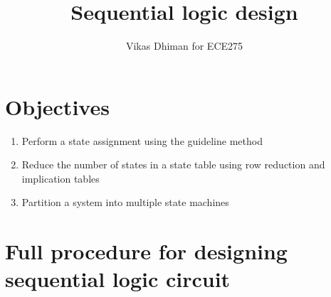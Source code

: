 \documentclass{article}
\author{Vikas Dhiman for ECE275}
\title{Sequential logic design}
\begin{document}
\maketitle


\section{Objectives}
\begin{enumerate}
\item Perform a state assignment using the guideline method
   \item Reduce the number of states in a state table using row reduction and
     implication tables
   \item Partition a system into multiple state machines
\end{enumerate}

\section{Full procedure for designing sequential logic circuit}
\end{document}
